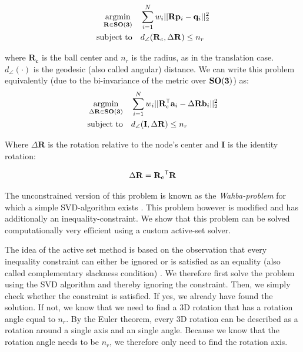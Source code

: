 \begin{equation}
	\label{eq:tls-rwls}
	\begin{aligned}
		\operatorname*{argmin}_{\mathbf{R} \in \mathbf{SO(3)}}  \quad &\sum_{i=1}^{N} w_i ||\mathbf{R}\mathbf{p}_i - \mathbf{q}_i ||_2^2 \\
		\text{subject to} \quad &d_{\angle}(\mathbf{R}_c, \Delta\mathbf{R}) \leq n_r
	\end{aligned}
\end{equation}

where $\mathbf{R_c}$ is the ball center and $n_r$ is the radius, as in the translation case. $d_{\angle}(\cdot)$ is the geodesic (also called angular) distance.
We can write this problem equivalently (due to the bi-invariance of the metric over $\mathbf{SO(3)}$) as:
\begin{equation}
	\label{eq:tls-rwls}
	\begin{aligned}
		\operatorname*{argmin}_{\Delta \mathbf{R} \in \mathbf{SO(3)}}  \quad &\sum_{i=1}^{N} w_i ||\mathbf{R}_c^{\mathsf{T}} \mathbf{a}_i - \Delta\mathbf{R} \mathbf{b}_i ||_2^2 \\
		\text{subject to} \quad &d_{\angle}(\mathbf{I}, \Delta\mathbf{R}) \leq n_r
	\end{aligned}
\end{equation}


Where $\Delta\mathbf{R}$ is the rotation relative to the node's center and $\mathbf{I}$ is the identity rotation:  

\begin{equation}
	\begin{aligned}
		\Delta\mathbf{R} = \mathbf{R_c}^{\mathsf{T}}\mathbf{R} 
	\end{aligned}
\end{equation}

The unconstrained version of this problem is known as the \textit{Wahba-problem} for which a simple SVD-algorithm exists \cite{Kabsch-1978-Point-set-alignment} \cite{Lawrence2019APA} \cite{Least-squares-estimation-point-sets-Umeyama-1991}. This problem however is modified and has additionally an inequality-constraint. We show that this problem can be solved computationally very efficient using a custom active-set solver.

The idea of the active set method is based on the observation that every inequality constraint can either be ignored or is satisfied as an equality (also called complementary slackness condition) \cite[Ch.15 p.424-427]{Numerical-Optimization-Nocedal-Wright}. We therefore first solve the problem using the SVD algorithm and thereby ignoring the constraint. Then, we simply check whether the constraint is satisfied. If yes, we already have found the solution. If not, we know that we need to find a 3D rotation that has a rotation angle equal to $n_r$. By the Euler theorem, every 3D rotation can be described as a rotation around a single axis and an single angle. Because we know that the rotation angle needs to be $n_r$, we therefore only need to find the rotation axis.

